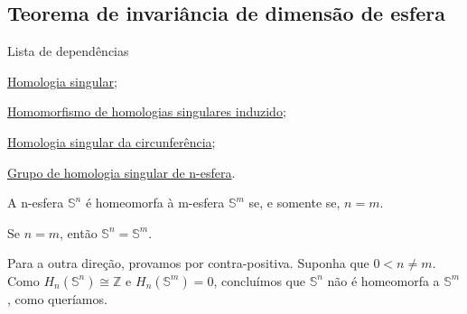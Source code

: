 \subsection{Teorema de invariância de dimensão de esfera} %
\label{teorema-de-invariancia-de-dimensao-de-esfera-prop}
\begin{titlemize}{Lista de dependências}
    \item \hyperref[homologia-singular-def]{Homologia singular};\\
    \item \hyperref[homomorfismo-de-homologias-singulares-induzido-prop]{Homomorfismo de homologias singulares induzido};\\
    \item \hyperref[homologia-singular-de-S1-prop]{Homologia singular da circunferência};\\
    \item \hyperref[grupo-de-homologia-singular-de-n-esfera-prop]{Grupo de homologia singular de n-esfera}.
\end{titlemize}

\begin{prop}
    A n-esfera $\mathbb{S}^n$ é homeomorfa à m-esfera $\mathbb{S}^m$ se, e somente se, $n=m$.
\end{prop}

\begin{dem}
    Se $n=m$, então $\mathbb{S}^n=\mathbb{S}^m$.

    Para a outra direção, provamos por contra-positiva. Suponha que $0<n\ne m$. Como $H_n(\mathbb{S}^n)\cong \mathbb{Z}$ e $H_n(\mathbb{S}^m)=0$, concluímos que $\mathbb{S}^n$ não é homeomorfa a $\mathbb{S}^m$, como queríamos.
\end{dem}

